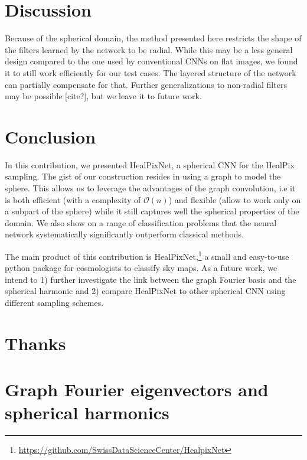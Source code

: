 \documentclass[final,twocolumn,3p,times,authoryear]{elsarticle}
\newcommand{\nati}[1]{{\color[rgb]{.1,.6,.1}{#1}}}
\newcommand{\1}{\b{1}}              %
\newcommand{\0}{\b{0}}              %
\begin{document}
\section{Discussion}

Because of the spherical domain, the method presented here restricts the shape of the filters learned by the network to be radial.
While this may be a less general design compared to the one used by conventional CNNs on flat images, we found it to still work efficiently for our test cases.
The layered structure of the network can partially compensate for that.
Further generalizations to non-radial filters may be possible [cite?], but we leave it to future work.

\nati{Should the discussion be merged with the result section?}

\section{Conclusion}
\label{sec:conclusion}

In this contribution, we presented HealPixNet, a spherical CNN for the HealPix sampling. The gist of our construction resides in using a graph to model the sphere.
This allows us to leverage the advantages of the graph convolution, i.e it is both efficient (with a complexity of $\mathcal{O}(n)$) and flexible (allow to work only on a subpart of the sphere) while it still captures well the spherical properties of the domain.
We also show on a range of classification problems that the neural network systematically significantly outperform classical methods.

The main product of this contribution is HealPixNet,\footnote{\url{https://github.com/SwissDataScienceCenter/HealpixNet}} a small and easy-to-use python package for cosmologists to classify sky maps.
As a future work, we intend to 1) further investigate the link between the graph Fourier basis and the spherical harmonic and 2) compare HealPixNet to other spherical CNN using different sampling schemes.

\section*{Thanks}

\appendix

\section{Graph Fourier eigenvectors and spherical harmonics}
\end{document}
